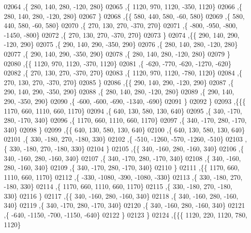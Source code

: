\begin{DoxyCode}
02064     ,\{   280,   140,   280,  -120,   280\}
02065     ,\{  1120,   970,  1120,  -350,  1120\}
02066     ,\{   280,   140,   280,  -120,   280\}
02067     \}
02068    ,\{\{   580,   440,   580,   -60,   580\}
02069     ,\{   580,   440,   580,   -60,   580\}
02070     ,\{   270,   130,   270,  -370,   270\}
02071     ,\{  -800,  -950,  -800, -1450,  -800\}
02072     ,\{   270,   130,   270,  -370,   270\}
02073     \}
02074    ,\{\{   290,   140,   290,  -120,   290\}
02075     ,\{   290,   140,   290,  -350,   290\}
02076     ,\{   280,   140,   280,  -120,   280\}
02077     ,\{   290,   140,   290,  -350,   290\}
02078     ,\{   280,   140,   280,  -120,   280\}
02079     \}
02080    ,\{\{  1120,   970,  1120,  -370,  1120\}
02081     ,\{  -620,  -770,  -620, -1270,  -620\}
02082     ,\{   270,   130,   270,  -370,   270\}
02083     ,\{  1120,   970,  1120,  -780,  1120\}
02084     ,\{   270,   130,   270,  -370,   270\}
02085     \}
02086    ,\{\{   290,   140,   290,  -120,   290\}
02087     ,\{   290,   140,   290,  -350,   290\}
02088     ,\{   280,   140,   280,  -120,   280\}
02089     ,\{   290,   140,   290,  -350,   290\}
02090     ,\{  -600,  -600,  -690, -1340,  -690\}
02091     \}
02092    \}
02093   ,\{\{\{  1170,   660,  1110,   660,  1170\}
02094     ,\{   640,   130,   580,   130,   640\}
02095     ,\{   340,  -170,   280,  -170,   340\}
02096     ,\{  1170,   660,  1110,   660,  1170\}
02097     ,\{   340,  -170,   280,  -170,   340\}
02098     \}
02099    ,\{\{   640,   130,   580,   130,   640\}
02100     ,\{   640,   130,   580,   130,   640\}
02101     ,\{   330,  -180,   270,  -180,   330\}
02102     ,\{  -510, -1260,  -570, -1260,  -510\}
02103     ,\{   330,  -180,   270,  -180,   330\}
02104     \}
02105    ,\{\{   340,  -160,   280,  -160,   340\}
02106     ,\{   340,  -160,   280,  -160,   340\}
02107     ,\{   340,  -170,   280,  -170,   340\}
02108     ,\{   340,  -160,   280,  -160,   340\}
02109     ,\{   340,  -170,   280,  -170,   340\}
02110     \}
02111    ,\{\{  1170,   660,  1110,   660,  1170\}
02112     ,\{  -330, -1080,  -390, -1080,  -330\}
02113     ,\{   330,  -180,   270,  -180,   330\}
02114     ,\{  1170,   660,  1110,   660,  1170\}
02115     ,\{   330,  -180,   270,  -180,   330\}
02116     \}
02117    ,\{\{   340,  -160,   280,  -160,   340\}
02118     ,\{   340,  -160,   280,  -160,   340\}
02119     ,\{   340,  -170,   280,  -170,   340\}
02120     ,\{   340,  -160,   280,  -160,   340\}
02121     ,\{  -640, -1150,  -700, -1150,  -640\}
02122     \}
02123    \}
02124   ,\{\{\{  1120,   220,  1120,   780,  1120\}

\end{DoxyCode}

